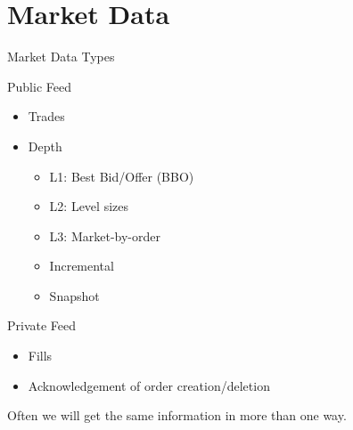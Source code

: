 \documentclass{beamer}
\newif\ifhasdiagram
\newcommand{\sectiondiagram}[1]{%
    \def\insertsdiagram{#1}%
    \hasdiagramtrue
}
\newcommand{\sectionquote}[1]{%
    \def\insertsquote{\small #1}%
}
\newcommand{\insertsdiagram}{}
\newcommand{\insertsquote}{}
\renewcommand{\insertsquote}{}
\renewcommand{\insertsdiagram}{}
\begin{document}

\sectiondiagram{market}
\sectionquote{``The race is not to the swift, nor the battle to the strong \ldots but time and chance happeneth to them all.'' Ecclesiastes \\ ``The race is not always to the swift, nor the battle to the strong – but that’s the way to bet.'' Anon.}
\section{Market Data}
\begin{frame}{Market Data Types}
	\begin{block}{Public Feed}
		\begin{itemize}
			\item Trades
			\item Depth
			\begin{itemize}
				\item L1: Best Bid/Offer (BBO)
				\item L2: Level sizes
				\item L3: Market-by-order%
				\item Incremental
				\item Snapshot
			\end{itemize}
		\end{itemize}
	\end{block}
	\begin{block}{Private Feed}
		\begin{itemize}
			\item Fills
			\item Acknowledgement of order creation/deletion
		\end{itemize}
	\end{block}

	Often we will get the same information in more than one way. 
\end{frame}
\end{document}

